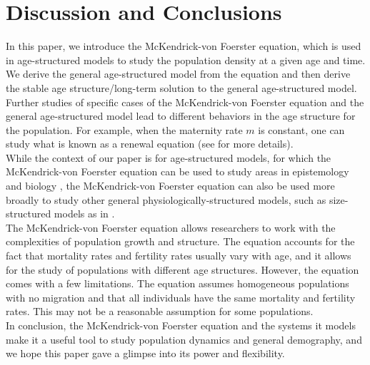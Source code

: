 \section{Discussion and Conclusions}

In this paper, we introduce the McKendrick-von Foerster equation, which is used in age-structured models to study the population density at a given age and time. We derive the general age-structured model from the equation and then derive the stable age structure/long-term solution to the general age-structured model. \\

Further studies of specific cases of the McKendrick-von Foerster equation and the general age-structured model lead to different behaviors in the age structure for the population. For example, when the maternity rate $m$ is constant, one can study what is known as a renewal equation (see \cite{logan} for more details). \\

While the context of our paper is for age-structured models, for which the McKendrick-von Foerster equation can be used to study areas in epistemology \cite{keyfitz_keyfitz} and biology \cite{vF1959}, the McKendrick-von Foerster equation can also be used more broadly to study other general physiologically-structured models, such as size-structured models as in \cite{deRoos_Persson}. \\

The McKendrick-von Foerster equation allows researchers to work with the complexities of population growth and structure. The equation accounts for the fact that mortality rates and fertility rates usually vary with age, and it allows for the study of populations with different age structures. However, the equation comes with a few limitations. The equation assumes homogeneous populations with no migration and that all individuals have the same mortality and fertility rates. This may not be a reasonable assumption for some populations. \\

In conclusion, the McKendrick-von Foerster equation and the systems it models make it a useful tool to study population dynamics and general demography, and we hope this paper gave a glimpse into its power and flexibility.
